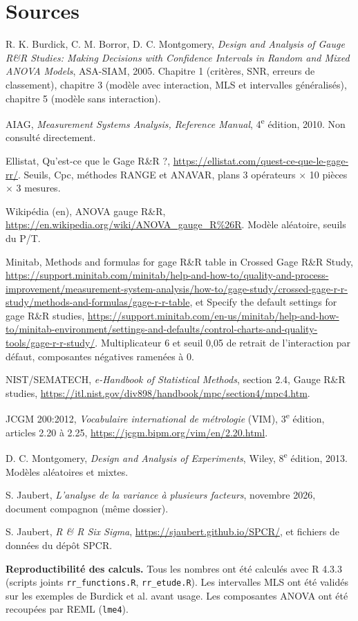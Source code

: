 \documentclass[11pt,a4paper]{article}
\theoremstyle{sj}
\theoremstyle{definition}
\theoremstyle{remark}
\providecommand{\og}{\guillemotleft\nobreakspace}
\providecommand{\fg}{\nobreakspace\guillemotright}
\newcommand{\nosp}[1]{{\XeTeXinterchartokenstate=0 #1}}
\begin{document}
\section{Sources}

\begin{enumerate}[label={[\arabic*]},leftmargin=2.2em,itemsep=3pt]
\item R. K. Burdick, C. M. Borror, D. C. Montgomery, \emph{Design and Analysis of Gauge R\&R Studies: Making Decisions with Confidence Intervals in Random and Mixed ANOVA Models}, ASA-SIAM, 2005. Chapitre 1 (critères, SNR, erreurs de classement), chapitre 3 (modèle avec interaction, MLS et intervalles généralisés), chapitre 5 (modèle sans interaction).
\item AIAG, \emph{Measurement Systems Analysis, Reference Manual}, 4\textsuperscript{e} édition, 2010. Non consulté directement.
\item Ellistat, \og Qu'est-ce que le Gage R\&R ?\fg{}, \url{https://ellistat.com/quest-ce-que-le-gage-rr/}. Seuils, Cpc, méthodes RANGE et ANAVAR, plans 3 opérateurs $\times$ 10 pièces $\times$ 3 mesures.
\item Wikipédia (en), \og ANOVA gauge R\&R\fg{}, \url{https://en.wikipedia.org/wiki/ANOVA_gauge_R\%26R}. Modèle aléatoire, seuils du P/T.
\item Minitab, \og Methods and formulas for gage R\&R table in Crossed Gage R\&R Study\fg{}, \url{https://support.minitab.com/minitab/help-and-how-to/quality-and-process-improvement/measurement-system-analysis/how-to/gage-study/crossed-gage-r-r-study/methods-and-formulas/gage-r-r-table}, et \og Specify the default settings for gage R\&R studies\fg{}, \url{https://support.minitab.com/en-us/minitab/help-and-how-to/minitab-environment/settings-and-defaults/control-charts-and-quality-tools/gage-r-r-study/}. Multiplicateur 6 et seuil 0,05 de retrait de l'interaction par défaut, composantes négatives ramenées à 0.
\item NIST/SEMATECH, \emph{e-Handbook of Statistical Methods}, section 2.4, \og Gauge R\&R studies\fg{}, \url{https://itl.nist.gov/div898/handbook/mpc/section4/mpc4.htm}.
\item \nosp{JCGM 200:2012}, \emph{Vocabulaire international de métrologie} (VIM), 3\textsuperscript{e} édition, articles 2.20 à 2.25, \url{https://jcgm.bipm.org/vim/en/2.20.html}.
\item D. C. Montgomery, \emph{Design and Analysis of Experiments}, Wiley, 8\textsuperscript{e} édition, 2013. Modèles aléatoires et mixtes.
\item S. Jaubert, \emph{L'analyse de la variance à plusieurs facteurs}, novembre 2026, document compagnon (même dossier).
\item S. Jaubert, \emph{R \& R Six Sigma}, \url{https://sjaubert.github.io/SPCR/}, et fichiers de données du dépôt SPCR.
\end{enumerate}

\textbf{Reproductibilité des calculs.} Tous les nombres ont été calculés avec R 4.3.3 (scripts joints \texttt{rr\_functions.R}, \texttt{rr\_etude.R}). Les intervalles MLS ont été validés sur les exemples de Burdick et al. avant usage. Les composantes ANOVA ont été recoupées par REML (\texttt{lme4}).
\end{document}
